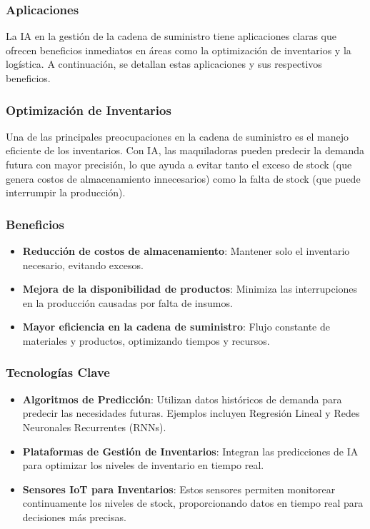 \subsubsection{Aplicaciones}

La IA en la gestión de la cadena de suministro tiene aplicaciones claras que ofrecen beneficios inmediatos en áreas como la optimización de inventarios y la logística. A continuación, se detallan estas aplicaciones y sus respectivos beneficios.

\subsubsection{Optimización de Inventarios}

Una de las principales preocupaciones en la cadena de suministro es el manejo eficiente de los inventarios. Con IA, las maquiladoras pueden predecir la demanda futura con mayor precisión, lo que ayuda a evitar tanto el exceso de stock (que genera costos de almacenamiento innecesarios) como la falta de stock (que puede interrumpir la producción).

\subsubsection{Beneficios}

\begin{itemize}
    \item \textbf{Reducción de costos de almacenamiento}: Mantener solo el inventario necesario, evitando excesos.
    \item \textbf{Mejora de la disponibilidad de productos}: Minimiza las interrupciones en la producción causadas por falta de insumos.
    \item \textbf{Mayor eficiencia en la cadena de suministro}: Flujo constante de materiales y productos, optimizando tiempos y recursos.
\end{itemize}

\subsubsection{Tecnologías Clave}

\begin{itemize}
    \item \textbf{Algoritmos de Predicción}: Utilizan datos históricos de demanda para predecir las necesidades futuras. Ejemplos incluyen Regresión Lineal y Redes Neuronales Recurrentes (RNNs).
    \item \textbf{Plataformas de Gestión de Inventarios}: Integran las predicciones de IA para optimizar los niveles de inventario en tiempo real.
    \item \textbf{Sensores IoT para Inventarios}: Estos sensores permiten monitorear continuamente los niveles de stock, proporcionando datos en tiempo real para decisiones más precisas.
\end{itemize}

